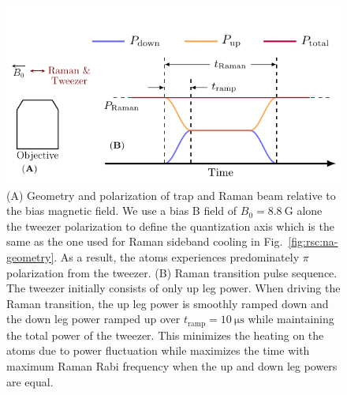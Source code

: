 \begin{figure}
  \centering
  \includegraphics[width=\textwidth]{figures/raman_spectroscopy_apparatus_sequence.pdf}
  \caption[Raman transition setup and sequence]{
    (A) Geometry and polarization of trap and Raman beam relative to the bias magnetic field.
    We use a bias B field of $B_0=8.8~\mathrm{G}$ alone the tweezer polarization
    to define the quantization axis
    which is the same as the one used for Raman sideband cooling in
    Fig.~\ref{fig:rsc:na-geometry}.
    As a result, the atoms experiences predominately $\pi$ polarization from the tweezer.
    (B) Raman transition pulse sequence.
    The tweezer initially consists of only up leg power.
    When driving the Raman transition, the up leg power is smoothly ramped down and
    the down leg power ramped up over $t_{\mathrm{ramp}}=10~\mathrm{\mu s}$
    while maintaining the total power of the tweezer.
    This minimizes the heating on the atoms due to power fluctuation while maximizes the time
    with maximum Raman Rabi frequency when the up and down leg powers are equal.
    \label{fig:raman-spectroscopy:apparatus-sequence}}
\end{figure}


